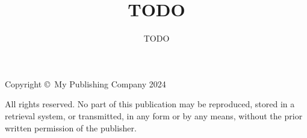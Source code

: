 \documentclass[openany,twopage,11pt]{book}
\title{TODO}
\author{TODO}
\date{}
\begin{document}
	
	\maketitle
	\clearpage
	
	\begin{center}
		\vspace*{\fill}
		\thispagestyle{empty}
		
		Copyright \copyright~My Publishing Company 2024
		
		All rights reserved. No part of this publication may be reproduced, stored in a retrieval system, or transmitted, in any form or by any means, without the prior written permission of the publisher.
		\clearpage
	\end{center}
	
	\tableofcontents
	\newpage
	
\end{document}
